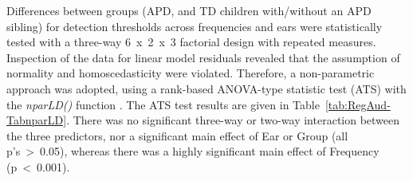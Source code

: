 \documentclass[a4paper, twoside]{templates/ociamthesis}
\begin{document}
\begin{table}

\caption{\label{tab:RegAud-Tab1}Standard audiometry: Descriptives for pure-tone detection thresholds (dB HL) by frequency (kHz) and ear split by the two groups.}
\centering
{}
\end{table}

Differences between groups (APD, and TD children with/without an APD sibling) for detection thresholds across frequencies and ears were statistically tested with a three-way 6~x~2~x~3 factorial design with repeated measures. Inspection of the data for linear model residuals revealed that the assumption of normality and homoscedasticity were violated. Therefore, a non-parametric approach was adopted, using a rank-based ANOVA-type statistic test (ATS) with the \emph{nparLD()} function \autocite[nparLD package;][]{nparLDPackageR}. The ATS test results are given in Table~\ref{tab:RegAud-TabnparLD}. There was no significant three-way or two-way interaction between the three predictors, nor a significant main effect of Ear or Group (all p's~\textgreater~0.05), whereas there was a highly significant main effect of Frequency (p~\textless~0.001).\\
\end{document}
